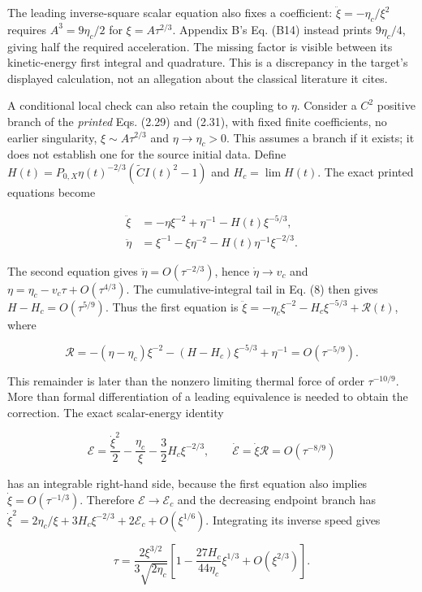 The leading inverse-square scalar equation also fixes a coefficient:
\(\ddot\xi=-\eta_c/\xi^2\) requires \(A^3=9\eta_c/2\) for
\(\xi=A\tau^{2/3}\). Appendix B's Eq. (B14) instead prints
\(9\eta_c/4\), giving half the required acceleration. The missing factor
is visible between its kinetic-energy first integral and quadrature.
This is a discrepancy in the target's displayed calculation, not an
allegation about the classical literature it cites.

A conditional local check can also retain the coupling to \(\eta\).
Consider a \(C^2\) positive branch of the \emph{printed} Eqs. (2.29) and
(2.31), with fixed finite coefficients, no earlier singularity,
\(\xi\sim A\tau^{2/3}\) and \(\eta\to\eta_c>0\). This assumes a branch
if it exists; it does not establish one for the source initial data.
Define \(H(t)=P_{0,X}\eta(t)^{-2/3}(\widetilde C I(t)^2-1)\) and
\(H_c=\lim H(t)\). The exact printed equations become

\[
\begin{aligned}
\ddot\xi&=-\eta\xi^{-2}+\eta^{-1}-H(t)\xi^{-5/3},\\
\ddot\eta&=\xi^{-1}-\xi\eta^{-2}-H(t)\eta^{-1}\xi^{-2/3}.
\end{aligned}
\]

The second equation gives \(\ddot\eta=O(\tau^{-2/3})\), hence
\(\dot\eta\to v_c\) and \(\eta=\eta_c-v_c\tau+O(\tau^{4/3})\). The
cumulative-integral tail in Eq. (8) then gives \(H-H_c=O(\tau^{5/9})\).
Thus the first equation is
\(\ddot\xi=-\eta_c\xi^{-2}-H_c\xi^{-5/3}+\mathcal R(t)\), where

\[
\mathcal R=-(\eta-\eta_c)\xi^{-2}-(H-H_c)\xi^{-5/3}+\eta^{-1}
=O(\tau^{-5/9}).
\]

This remainder is later than the nonzero limiting thermal force of order
\(\tau^{-10/9}\). More than formal differentiation of a leading
equivalence is needed to obtain the correction. The exact scalar-energy
identity

\[
\mathcal E=\frac{\dot\xi^2}{2}-\frac{\eta_c}{\xi}-\frac32H_c\xi^{-2/3},
\qquad\dot{\mathcal E}=\dot\xi\mathcal R=O(\tau^{-8/9})
\]

has an integrable right-hand side, because the first equation also
implies \(\dot\xi=O(\tau^{-1/3})\). Therefore
\(\mathcal E\to\mathcal E_c\) and the decreasing endpoint branch has
\(\dot\xi^2=2\eta_c/\xi+3H_c\xi^{-2/3}+2\mathcal E_c+O(\xi^{1/6})\).
Integrating its inverse speed gives

\[
\tau=\frac{2\xi^{3/2}}{3\sqrt{2\eta_c}}
\left[1-\frac{27H_c}{44\eta_c}\xi^{1/3}+O(\xi^{2/3})\right].
\]

